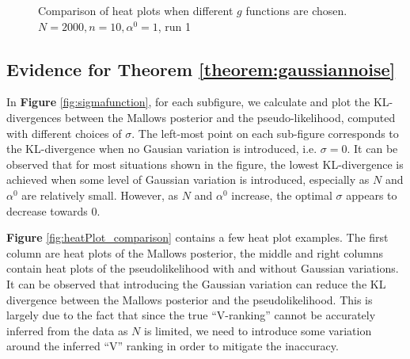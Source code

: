 \documentclass[11pt, oneside]{article}   	%
\begin{document}
\begin{figure}[h!]
\begin{minipage}[t]{.45\textwidth}
		\end{minipage} 

	\caption{Comparison of heat plots when different $g$ functions are chosen. $N = 2000, n = 10, \alpha^0 = 1$, run 1}
	\label{fig:heatPlot_comparison_g}
\end{figure}


\subsection{Evidence for Theorem \ref{theorem:gaussiannoise}}
In \textbf{Figure} \ref{fig:sigmafunction}, for each subfigure, we calculate and plot the KL-divergences between the Mallows posterior and the pseudo-likelihood, computed with different choices of $\sigma$. The left-most point on each sub-figure corresponds to the KL-divergence when no Gausian variation is introduced, i.e. $\sigma = 0$. It can be observed that for most situations shown in the figure, the lowest KL-divergence is achieved when some level of Gaussian variation is introduced, especially as $N$ and $\alpha^0$ are relatively small. However, as $N$ and $\alpha^0$ increase, the optimal $\sigma$ appears to decrease towards 0. 

\textbf{Figure} \ref{fig:heatPlot_comparison} contains a few heat plot examples. The first column are heat plots of the Mallows posterior, the middle and right columns contain heat plots of the pseudolikelihood with and without Gaussian variations. It can be observed that introducing the Gaussian variation can reduce the KL divergence between the Mallows posterior and the pseudolikelihood. This is largely due to the fact that since the true ``V-ranking'' cannot be accurately inferred from the data as $N$ is limited, we need to introduce some variation around the inferred ``V'' ranking in order to mitigate the inaccuracy.
\end{document}
